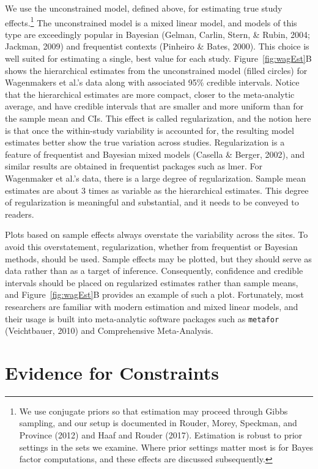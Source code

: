 \documentclass[english,man]{apa6}
\theoremstyle{definition}
\theoremstyle{definition}
\theoremstyle{definition}
\theoremstyle{remark}
\begin{document}
We use the unconstrained model, defined above, for estimating true study
effects.\footnote{We use conjugate priors so that estimation may proceed
  through Gibbs sampling, and our setup is documented in Rouder, Morey,
  Speckman, and Province (2012) and Haaf and Rouder (2017). Estimation
  is robust to prior settings in the sets we examine. Where prior
  settings matter most is for Bayes factor computations, and these
  effects are discussed subsequently.} The unconstrained model is a
mixed linear model, and models of this type are exceedingly popular in
Bayesian (Gelman, Carlin, Stern, \& Rubin, 2004; Jackman, 2009) and
frequentist contexts (Pinheiro \& Bates, 2000). This choice is well
suited for estimating a single, best value for each study.
Figure~\ref{fig:wagEst}B shows the hierarchical estimates from the
unconstrained model (filled circles) for Wagenmakers et al.'s data along
with associated 95\% credible intervals. Notice that the hierarchical
estimates are more compact, closer to the meta-analytic average, and
have credible intervals that are smaller and more uniform than for the
sample mean and CIs. This effect is called regularization, and the
notion here is that once the within-study variability is accounted for,
the resulting model estimates better show the true variation across
studies. Regularization is a feature of frequentist and Bayesian mixed
models (Casella \& Berger, 2002), and similar results are obtained in
frequentist packages such as lmer. For Wagenmaker et al.'s data, there
is a large degree of regularization. Sample mean estimates are about 3
times as variable as the hierarchical estimates. This degree of
regularization is meaningful and substantial, and it needs to be
conveyed to readers.

Plots based on sample effects always overstate the variability across
the sites. To avoid this overstatement, regularization, whether from
frequentist or Bayesian methods, should be used. Sample effects may be
plotted, but they should serve as data rather than as a target of
inference. Consequently, confidence and credible intervals should be
placed on regularized estimates rather than sample means, and
Figure~\ref{fig:wagEst}B provides an example of such a plot.
Fortunately, most researchers are familiar with modern estimation and
mixed linear models, and their usage is built into meta-analytic
software packages such as \texttt{metafor} (Veichtbauer, 2010) and
Comprehensive Meta-Analysis.

\section{Evidence for Constraints}\label{evidence-for-constraints}
\end{document}
